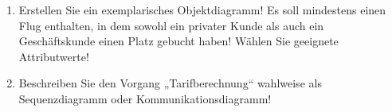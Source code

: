 \documentclass{lehramt-informatik}
\begin{document}
\begin{enumerate}

\item Erstellen Sie ein exemplarisches Objektdiagramm! Es soll
mindestens einen Flug enthalten, in dem sowohl ein privater Kunde als
auch ein Geschäftskunde einen Platz gebucht haben! Wählen Sie geeignete
Attributwerte!


\item Beschreiben Sie den Vorgang „Tarifberechnung“ wahlweise als
Sequenzdiagramm oder Kommunikationsdiagramm!

\end{enumerate}

\literatur
\end{document}
